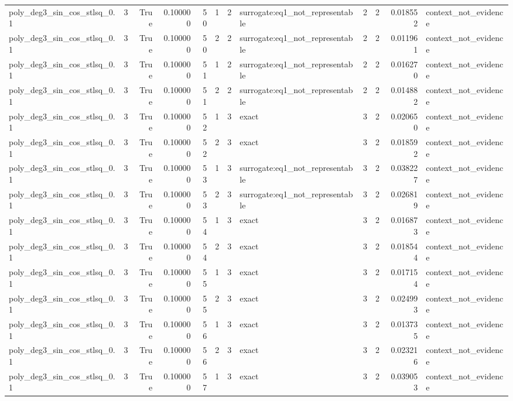 \begin{tabular}{lrrrrrrlrrrl}
poly\_deg3\_sin\_cos\_stlsq\_0.1 & 3 & True & 0.100000 & 50 & 1 & 2 & surrogate:eq1\_not\_representable & 2 & 2 & 0.018552 & context\_not\_evidence \\
poly\_deg3\_sin\_cos\_stlsq\_0.1 & 3 & True & 0.100000 & 50 & 2 & 2 & surrogate:eq1\_not\_representable & 2 & 2 & 0.011961 & context\_not\_evidence \\
poly\_deg3\_sin\_cos\_stlsq\_0.1 & 3 & True & 0.100000 & 51 & 1 & 2 & surrogate:eq1\_not\_representable & 2 & 2 & 0.016270 & context\_not\_evidence \\
poly\_deg3\_sin\_cos\_stlsq\_0.1 & 3 & True & 0.100000 & 51 & 2 & 2 & surrogate:eq1\_not\_representable & 2 & 2 & 0.014882 & context\_not\_evidence \\
poly\_deg3\_sin\_cos\_stlsq\_0.1 & 3 & True & 0.100000 & 52 & 1 & 3 & exact & 3 & 2 & 0.020650 & context\_not\_evidence \\
poly\_deg3\_sin\_cos\_stlsq\_0.1 & 3 & True & 0.100000 & 52 & 2 & 3 & exact & 3 & 2 & 0.018592 & context\_not\_evidence \\
poly\_deg3\_sin\_cos\_stlsq\_0.1 & 3 & True & 0.100000 & 53 & 1 & 3 & surrogate:eq1\_not\_representable & 3 & 2 & 0.038227 & context\_not\_evidence \\
poly\_deg3\_sin\_cos\_stlsq\_0.1 & 3 & True & 0.100000 & 53 & 2 & 3 & surrogate:eq1\_not\_representable & 3 & 2 & 0.026819 & context\_not\_evidence \\
poly\_deg3\_sin\_cos\_stlsq\_0.1 & 3 & True & 0.100000 & 54 & 1 & 3 & exact & 3 & 2 & 0.016873 & context\_not\_evidence \\
poly\_deg3\_sin\_cos\_stlsq\_0.1 & 3 & True & 0.100000 & 54 & 2 & 3 & exact & 3 & 2 & 0.018544 & context\_not\_evidence \\
poly\_deg3\_sin\_cos\_stlsq\_0.1 & 3 & True & 0.100000 & 55 & 1 & 3 & exact & 3 & 2 & 0.017154 & context\_not\_evidence \\
poly\_deg3\_sin\_cos\_stlsq\_0.1 & 3 & True & 0.100000 & 55 & 2 & 3 & exact & 3 & 2 & 0.024993 & context\_not\_evidence \\
poly\_deg3\_sin\_cos\_stlsq\_0.1 & 3 & True & 0.100000 & 56 & 1 & 3 & exact & 3 & 2 & 0.013735 & context\_not\_evidence \\
poly\_deg3\_sin\_cos\_stlsq\_0.1 & 3 & True & 0.100000 & 56 & 2 & 3 & exact & 3 & 2 & 0.023216 & context\_not\_evidence \\
poly\_deg3\_sin\_cos\_stlsq\_0.1 & 3 & True & 0.100000 & 57 & 1 & 3 & exact & 3 & 2 & 0.039053 & context\_not\_evidence \\

\end{tabular}
